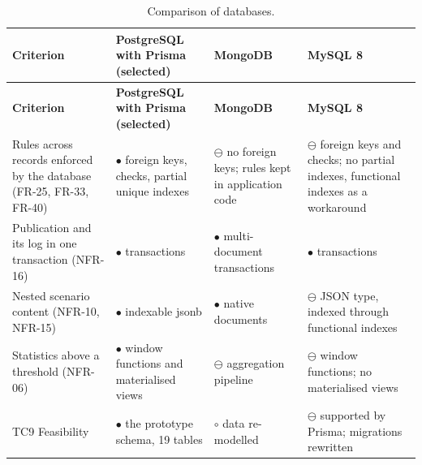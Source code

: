 {\small{}\renewcommand{\arraystretch}{1.1}
\begin{longtable}{|>{\raggedright\arraybackslash}p{}|>{\raggedright\arraybackslash}p{}|>{\raggedright\arraybackslash}p{}|>{\raggedright\arraybackslash}p{}|}
\caption{Comparison of databases.} \\
\hline
\textbf{Criterion} & \textbf{PostgreSQL with Prisma (selected)} & \textbf{MongoDB\cite{r182}} & \textbf{MySQL 8\cite{r183}} \\ \hline
\endfirsthead
\hline
\textbf{Criterion} & \textbf{PostgreSQL with Prisma (selected)} & \textbf{MongoDB\cite{r182}} & \textbf{MySQL 8\cite{r183}} \\ \hline
\endhead
Rules across records enforced by the database (FR-25, FR-33, FR-40) & $\bullet$ foreign keys, checks, partial unique indexes\cite{r151} & $\ominus$ no foreign keys; rules kept in application code & $\ominus$ foreign keys and checks; no partial indexes, functional indexes as a workaround \\ \hline
Publication and its log in one transaction (NFR-16) & $\bullet$ transactions & $\bullet$ multi-\allowbreak{}document transactions\cite{r182} & $\bullet$ transactions \\ \hline
Nested scenario content (NFR-10, NFR-15) & $\bullet$ indexable jsonb\cite{r152} & $\bullet$ native documents & $\ominus$ JSON type, indexed through functional indexes \\ \hline
Statistics above a threshold (NFR-06) & $\bullet$ window functions and materialised views & $\ominus$ aggregation pipeline & $\ominus$ window functions; no materialised views \\ \hline
TC9 Feasibility & $\bullet$ the prototype schema, 19 tables & $\circ$ data re-modelled & $\ominus$ supported by Prisma; migrations rewritten \\ \hline
\end{longtable}
}

